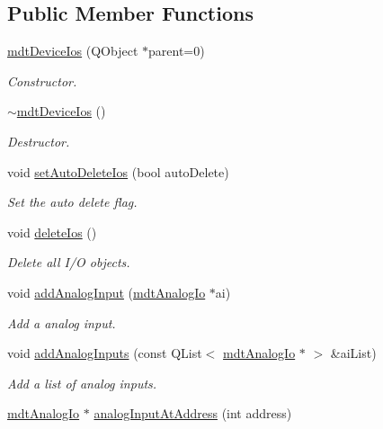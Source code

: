 \subsection*{Public Member Functions}
\begin{DoxyCompactItemize}
\item 
\hyperlink{classmdt_device_ios_a44939a10d66421069bdd4b8717e2798c}{mdt\-Device\-Ios} (Q\-Object $\ast$parent=0)
\begin{DoxyCompactList}\small\item\em Constructor. \end{DoxyCompactList}\item 
\hyperlink{classmdt_device_ios_a8e1e02aeecd2617a8696ba625192bd19}{$\sim$mdt\-Device\-Ios} ()
\begin{DoxyCompactList}\small\item\em Destructor. \end{DoxyCompactList}\item 
void \hyperlink{classmdt_device_ios_af771f8080ce4a7260baa0acccacae0e1}{set\-Auto\-Delete\-Ios} (bool auto\-Delete)
\begin{DoxyCompactList}\small\item\em Set the auto delete flag. \end{DoxyCompactList}\item 
void \hyperlink{classmdt_device_ios_a272fc1fa86e1b66e6af0e58b130939e0}{delete\-Ios} ()
\begin{DoxyCompactList}\small\item\em Delete all I/\-O objects. \end{DoxyCompactList}\item 
void \hyperlink{classmdt_device_ios_a0e2683630eff9410003a36ae5af76b52}{add\-Analog\-Input} (\hyperlink{classmdt_analog_io}{mdt\-Analog\-Io} $\ast$ai)
\begin{DoxyCompactList}\small\item\em Add a analog input. \end{DoxyCompactList}\item 
void \hyperlink{classmdt_device_ios_a776dc0508f88f8ea206801fc7472bfb2}{add\-Analog\-Inputs} (const Q\-List$<$ \hyperlink{classmdt_analog_io}{mdt\-Analog\-Io} $\ast$ $>$ \&ai\-List)
\begin{DoxyCompactList}\small\item\em Add a list of analog inputs. \end{DoxyCompactList}\item 
\hyperlink{classmdt_analog_io}{mdt\-Analog\-Io} $\ast$ \hyperlink{classmdt_device_ios_ad74dc114cec2029aa9a14714f13666c7}{analog\-Input\-At\-Address} (int address)

\end{DoxyCompactItemize}
